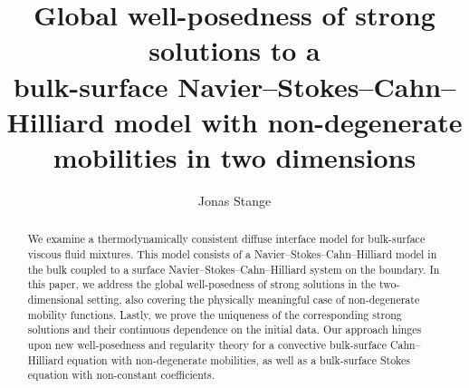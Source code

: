 \documentclass[10pt,reqno]{amsart}
\theoremstyle{remark}
\numberwithin{equation}{section}
\begin{document}
\title[Global well-Posedness of strong solutions to a bulk-surface NSCH system]{Global well-posedness of strong solutions to a \\ bulk-surface Navier--Stokes--Cahn--Hilliard model with non-degenerate mobilities in two dimensions}
\author[J. Stange]{Jonas Stange}

\address{Fakult\"{a}t f\"{u}r Mathematik\\ 
Universit\"{a}t Regensburg \\
93040 Regensburg, Germany\\
\href{mailto:jonas.stange@ur.de}{jonas.stange@ur.de}
}


\begin{abstract} We examine a thermodynamically consistent diffuse interface model for bulk-surface viscous fluid mixtures. This model consists of a Navier--Stokes--Cahn--Hilliard model in the bulk coupled to a surface Navier--Stokes--Cahn--Hilliard system on the boundary. In this paper, we address the global well-posedness of strong solutions in the two-dimensional setting, also covering the physically meaningful case of non-degenerate mobility functions. Lastly, we prove the uniqueness of the corresponding strong solutions and their continuous dependence on the initial data. Our approach hinges upon new well-posedness and regularity theory for a convective bulk-surface Cahn--Hilliard equation with non-degenerate mobilities, as well as a bulk-surface Stokes equation with non-constant coefficients.
\end{abstract}
\end{document}
